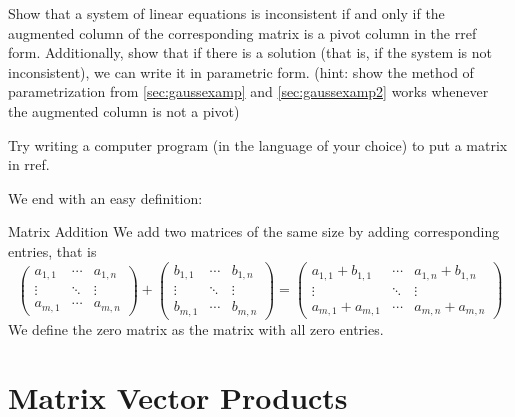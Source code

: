 \documentclass[Main.tex]{subfiles}
\begin{document}
\begin{Ex}
  \label{sec:allparam}
  Show that a system of linear equations is inconsistent if and only if the augmented column of the corresponding matrix is a pivot column in the rref form.  
  Additionally, show that if there is a solution (that is, if the system is not inconsistent), we can write it in parametric form.  
  (hint: show the method of parametrization from \ref{sec:gaussexamp} and \ref{sec:gaussexamp2} works whenever the augmented column is not a pivot)
\end{Ex}

\begin{ExProg}[(optional)]
  Try writing a computer program (in the language of your choice) to put a matrix in rref. 
\end{ExProg}
We end with an easy definition:
\begin{Def}{Matrix Addition}
  We add two matrices of the same size by adding corresponding entries, that is
  \[\left(\begin{array}{cccc}
      a_{1,1} &  \cdots & a_{1,n}\\
      \vdots     & \ddots  & \vdots\\
      a_{m,1} & \cdots  & a_{m,n}
    \end{array}\right) + 
  \left(\begin{array}{cccc}
      b_{1,1} &  \cdots & b_{1,n}\\
      \vdots     & \ddots  & \vdots\\
      b_{m,1} & \cdots  & b_{m,n}
    \end{array}\right) =
  \left(\begin{array}{cccc}
      a_{1,1} + b_{1,1} &  \cdots & a_{1,n} + b_{1,n}\\
      \vdots     & \ddots  & \vdots\\
      a_{m,1}+a_{m,1} & \cdots  & a_{m,n}+a_{m,n}
    \end{array}\right)\]
  We define the zero matrix as the matrix with all zero entries.  
\end{Def}


\exersisesf

\section{Matrix Vector Products}
\end{document}
